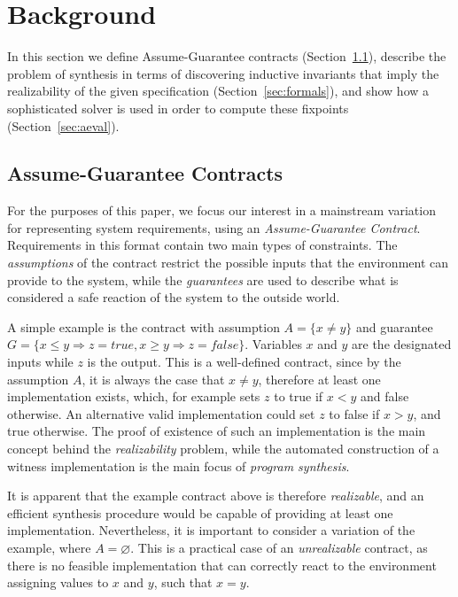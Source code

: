 \section{Background}
\label{sec:background}


In this section we define Assume-Guarantee contracts (Section~\ref{sec:pre}),
describe the problem of synthesis in terms of discovering inductive invariants that imply the realizability of the given specification (Section~\ref{sec:formals}), and show how a sophisticated solver is used in order to compute these fixpoints (Section~\ref{sec:aeval}).

\subsection{Assume-Guarantee Contracts}
\label{sec:pre}

For the purposes of this paper, we focus our interest in a mainstream variation
for representing system requirements, using an \textit{Assume-Guarantee
Contract}. Requirements in this format contain two main types of constraints.
The \emph{assumptions} of the contract restrict the possible inputs that the
environment can provide to the system, while the \emph{guarantees} are used to
describe what is considered a safe reaction of the system to the outside world.

A simple example is the contract with assumption $A = \{x\neq
y\}$ and guarantee $G = \{x \leq y \Rightarrow z =
\textit{true}, x \geq y \Rightarrow z = \textit{false}\}$. Variables
$x$ and $y$ are the designated inputs while $z$ is the output. This is a
well-defined contract, since by the assumption $A$, it is always the case that
$x \neq y$, therefore at least one implementation exists, which, for example
sets $z$ to true if $x < y$ and false otherwise. An alternative
valid implementation could set $z$ to false if $x > y$, and true otherwise. The
proof of existence of such an implementation is the main concept behind the
\emph{realizability} problem, while the automated construction of a witness
implementation is the main focus of \emph{program synthesis}.


It is apparent that the example contract above is therefore \emph{realizable},
and an efficient synthesis procedure would be capable of providing at least one
implementation. Nevertheless, it is important to consider a variation of the
example, where $A = \varnothing$. This is a practical case of an
\emph{unrealizable} contract, as there is no feasible implementation that can
correctly react to the environment assigning values to $x$ and $y$, such that
$x = y$.

